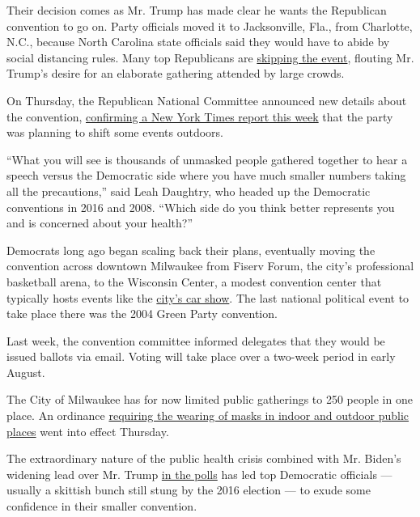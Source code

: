 Their decision comes as Mr. Trump has made clear he wants the Republican
convention to go on. Party officials moved it to Jacksonville, Fla.,
from Charlotte, N.C., because North Carolina state officials said they
would have to abide by social distancing rules. Many top Republicans are
\href{https://www.nytimes.com/2020/07/13/us/politics/florida-virus-republican-convention.html}{skipping
the event}, flouting Mr. Trump's desire for an elaborate gathering
attended by large crowds.

On Thursday, the Republican National Committee announced new details
about the convention,
\href{https://www.nytimes.com/2020/07/14/us/politics/republican-convention-jacksonville-virus-outdoors.html}{confirming
a New York Times report this week} that the party was planning to shift
some events outdoors.

``What you will see is thousands of unmasked people gathered together to
hear a speech versus the Democratic side where you have much smaller
numbers taking all the precautions,'' said Leah Daughtry, who headed up
the Democratic conventions in 2016 and 2008. ``Which side do you think
better represents you and is concerned about your health?''

Democrats long ago began scaling back their plans, eventually moving the
convention across downtown Milwaukee from Fiserv Forum, the city's
professional basketball arena, to the Wisconsin Center, a modest
convention center that typically hosts events like the
\href{http://autoshowmilwaukee.com/}{city's car show}. The last national
political event to take place there was the 2004 Green Party convention.

Last week, the convention committee informed delegates that they would
be issued ballots via email. Voting will take place over a two-week
period in early August.

The City of Milwaukee has for now limited public gatherings to 250
people in one place. An ordinance
\href{https://city.milwaukee.gov/Coronavirus/Prevention\#masks}{requiring
the wearing of masks in indoor and outdoor public places} went into
effect Thursday.

The extraordinary nature of the public health crisis combined with Mr.
Biden's widening lead over Mr. Trump
\href{https://www.nytimes.com/2020/07/16/upshot/polls-biden-trump-how-accurate.html}{in
the polls} has led top Democratic officials --- usually a skittish bunch
still stung by the 2016 election --- to exude some confidence in their
smaller convention.

